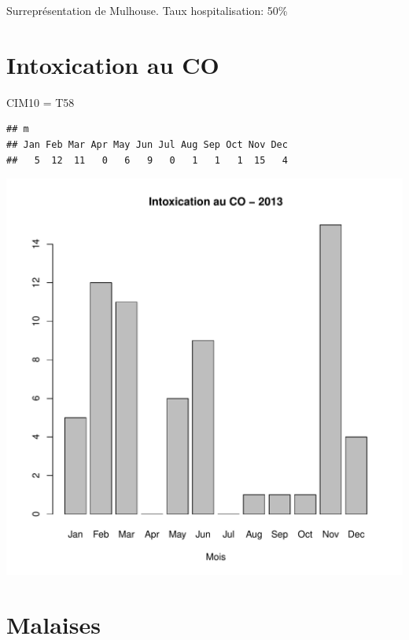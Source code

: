 \documentclass[12pt,english,french,twoside]{book}\usepackage[]{graphicx}\usepackage[]{color}
\makeatletter
\def\maxwidth{ %
  \ifdim\Gin@nat@width>\linewidth
    \linewidth
  \else
    \Gin@nat@width
  \fi
}
\newenvironment{kframe}{%
 \def\at@end@of@kframe{}%
 \ifinner\ifhmode%
  \def\at@end@of@kframe{\end{minipage}}%
  \begin{minipage}{\columnwidth}%
 \fi\fi%
 \def\FrameCommand##1{\hskip\@totalleftmargin \hskip-\fboxsep
 \colorbox{shadecolor}{##1}\hskip-\fboxsep
     \hskip-\linewidth \hskip-\@totalleftmargin \hskip\columnwidth}%
 \MakeFramed {\advance\hsize-\width
   \@totalleftmargin\z@ \linewidth\hsize
   \@setminipage}}%
 {\par\unskip\endMakeFramed%
 \at@end@of@kframe}
\newenvironment{knitrout}{}{} %
\makeatother
\begin{document}
Surreprésentation de Mulhouse. 
Taux hospitalisation: 50\%


\section{Intoxication au CO}

CIM10 = T58

\begin{knitrout}
\color{fgcolor}\begin{kframe}
\begin{verbatim}
## m
## Jan Feb Mar Apr May Jun Jul Aug Sep Oct Nov Dec 
##   5  12  11   0   6   9   0   1   1   1  15   4
\end{verbatim}
\end{kframe}
\includegraphics[width=\maxwidth]{figure/co} 

\end{knitrout}



\section{Malaises}
\end{document}
